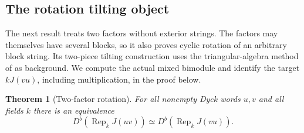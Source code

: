 \documentclass[11pt]{article}
\newtheorem{theorem}{Theorem}[section]
\theoremstyle{definition}
\newcommand{\Rep}{\operatorname{Rep}}
\newcommand{\Db}{D^b}
\begin{document}
\subsection{The rotation tilting object}
The next result treats two factors without exterior strings. The
factors may themselves have several blocks, so it also proves
cyclic rotation of an arbitrary block string.
Its two-piece tilting construction uses the triangular-algebra method
of \cite[Theorems 4.5 and 4.9]{LadkaniTriangular} as background.
We compute the actual mixed bimodule and identify the target
$kJ(vu)$, including multiplication, in the proof below.

\begin{theorem}[Two-factor rotation]\label{thm:rotation}
For all nonempty Dyck words $u,v$ and all fields $k$ there is an
equivalence
\[
 \Db(\Rep_k J(uv))\simeq\Db(\Rep_k J(vu)).
\]
\end{theorem}
\end{document}
